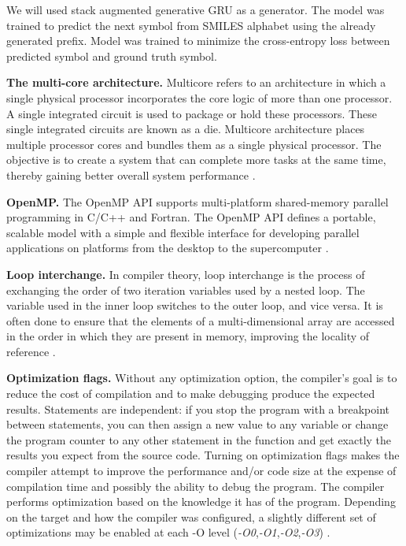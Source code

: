 \documentclass[conference]{IEEEtran}
\newcommand{\mypar}[1]{{\bf #1.}}
\begin{document}
We will used stack augmented generative GRU as a generator. The model was trained to predict the next symbol from SMILES alphabet using the already generated prefix. Model was trained to minimize the cross-entropy loss between predicted symbol and ground truth symbol.

\mypar{The multi-core architecture}
Multicore refers to an architecture in which a single physical processor incorporates the core logic of more than one processor. A single integrated circuit is used to package or hold these processors. These single integrated circuits are known as a die. Multicore architecture places multiple processor cores and bundles them as a single physical processor. The objective is to create a system that can complete more tasks at the same time, thereby gaining better overall system performance \cite{techopedia}.

\mypar{OpenMP}
The OpenMP API supports multi-platform shared-memory parallel programming in C/C++ and Fortran. The OpenMP API defines a portable, scalable model with a simple and flexible interface for developing parallel applications on platforms from the desktop to the supercomputer \cite{openmp}.

\mypar{Loop interchange}
In compiler theory, loop interchange is the process of exchanging the order of two iteration variables used by a nested loop. The variable used in the inner loop switches to the outer loop, and vice versa. It is often done to ensure that the elements of a multi-dimensional array are accessed in the order in which they are present in memory, improving the locality of reference \cite{loop-interchange}.

\mypar{Optimization flags}
Without any optimization option, the compiler's goal is to reduce the cost of compilation and to make debugging produce the expected results. Statements are independent: if you stop the program with a breakpoint between statements, you can then assign a new value to any variable or change the program counter to any other statement in the function and get exactly the results you expect from the source code. 
Turning on optimization flags makes the compiler attempt to improve the performance and/or code size at the expense of compilation time and possibly the ability to debug the program. 
The compiler performs optimization based on the knowledge it has of the program. 
Depending on the target and how the compiler was configured, a slightly different set of optimizations may be enabled at each -O level (\textit{-O0},\textit{-O1},\textit{-O2},\textit{-O3}) \cite{optimization-flags}.
\end{document}
